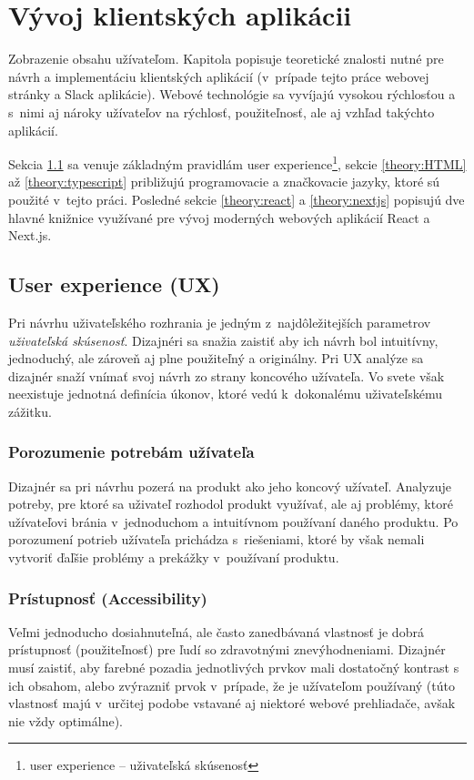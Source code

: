 \chapter{Vývoj klientských aplikácii}
\label{theory:client_dev}
Zobrazenie obsahu užívateľom. Kapitola popisuje teoretické znalosti nutné pre návrh a implementáciu klientských aplikácií (v~prípade tejto práce webovej stránky a Slack aplikácie). Webové technológie sa vyvíjajú vysokou rýchlosťou a s~nimi aj nároky užívateľov na rýchlosť, použiteľnosť, ale aj vzhľad takýchto aplikácií.

Sekcia \ref{theory:UX} sa venuje základným pravidlám user experience\footnote{user experience -- uživateľská skúsenosť}, sekcie \ref{theory:HTML} až \ref{theory:typescript} približujú programovacie a značkovacie jazyky, ktoré sú použité v~tejto práci. Posledné sekcie \ref{theory:react} a \ref{theory:nextjs} popisujú dve hlavné knižnice využívané pre vývoj moderných webových aplikácií React a Next.js.

\section{User experience (UX)}
\label{theory:UX}
Pri návrhu uživateľského rozhrania je jedným z~najdôležitejších parametrov \emph{uživateľská skúsenosť}. Dizajnéri sa snažia zaistiť aby ich návrh bol intuitívny, jednoduchý, ale zároveň aj plne použiteľný a originálny. Pri UX analýze sa dizajnér snaží vnímať svoj návrh zo strany koncového užívateľa. Vo svete však neexistuje jednotná definícia úkonov, ktoré vedú k~dokonalému uživateľskému zážitku.

\subsection{Porozumenie potrebám užívateľa}
Dizajnér sa pri návrhu pozerá na produkt ako jeho koncový užívateľ. Analyzuje potreby, pre ktoré sa uživateľ rozhodol produkt využívať, ale aj problémy, ktoré užívateľovi bránia v~jednoduchom a intuitívnom používaní daného produktu. Po porozumení potrieb užívateľa prichádza s~riešeniami, ktoré by však nemali vytvoriť ďaľšie problémy a prekážky v~používaní produktu.

\subsection{Prístupnosť (Accessibility)}
Veľmi jednoducho dosiahnuteľná, ale často zanedbávaná vlastnosť je dobrá prístupnosť (použiteľnosť) pre ľudí so zdravotnými znevýhodneniami. Dizajnér musí zaistiť, aby farebné pozadia jednotlivých prvkov mali dostatočný kontrast s ich obsahom, alebo zvýrazniť prvok v~prípade, že je užívateľom používaný (túto vlastnosť majú v~určitej podobe vstavané aj niektoré webové prehliadače, avšak nie vždy optimálne).


